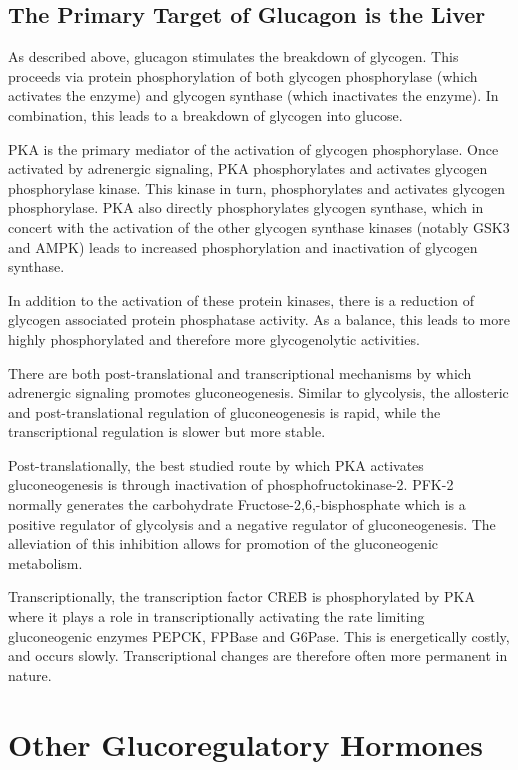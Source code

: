\documentclass{tufte-handout}
\begin{document}
\subsection{The Primary Target of Glucagon is the Liver}

As described above, glucagon stimulates the breakdown of glycogen.  This proceeds via protein phosphorylation of both glycogen phosphorylase (which activates the enzyme) and glycogen synthase (which inactivates the enzyme).  In combination, this leads to a breakdown of glycogen into glucose.

PKA is the primary mediator of the activation of glycogen phosphorylase.  Once activated by adrenergic signaling, PKA phosphorylates and activates glycogen phosphorylase kinase.  This kinase in turn, phosphorylates and activates glycogen phosphorylase\cite{Krebs1956}.  PKA also directly phosphorylates glycogen synthase, which in concert with the activation of the other glycogen synthase kinases (notably GSK3 and AMPK) leads to increased phosphorylation and inactivation of glycogen synthase.

In addition to the activation of these protein kinases, there is a reduction of glycogen associated protein phosphatase activity.  As a balance, this leads to more highly phosphorylated and therefore more glycogenolytic activities.

  There are both post-translational and transcriptional mechanisms by which adrenergic signaling promotes gluconeogenesis.  Similar to glycolysis, the allosteric and post-translational regulation of gluconeogenesis is rapid, while the transcriptional regulation is slower but more stable.

Post-translationally, the best studied route by which PKA activates gluconeogenesis is through inactivation of phosphofructokinase-2.  PFK-2 normally generates the carbohydrate Fructose-2,6,-bisphosphate which is a positive regulator of glycolysis and a negative regulator of gluconeogenesis.  The alleviation of this inhibition allows for promotion of the gluconeogenic metabolism.  

Transcriptionally, the transcription factor CREB is phosphorylated by PKA where it plays a role in transcriptionally activating the rate limiting gluconeogenic enzymes PEPCK, FPBase and G6Pase.  This is energetically costly, and occurs slowly.  Transcriptional changes are therefore often more permanent in nature.

\section{Other Glucoregulatory Hormones}
\end{document}
